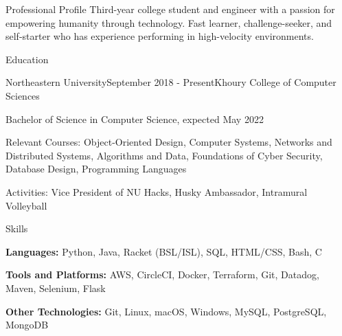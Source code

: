 \documentclass{resume}
\begin{document}
\begin{rSection}{Professional Profile}
Third-year college student and engineer with a passion for empowering humanity through technology. 
Fast learner, challenge-seeker, and self-starter who has experience performing in high-velocity environments.      
\end{rSection}


\begin{rSection}{Education}
\begin{rSubsection}{Northeastern University}{September 2018 - Present}{Khoury College of Computer Sciences}{}
\item Bachelor of Science in Computer Science, expected May 2022
\item Relevant Courses: Object-Oriented Design, Computer Systems, Networks and Distributed Systems,  Algorithms and Data, Foundations of Cyber Security, Database Design, Programming Languages
\item Activities: Vice President of NU Hacks, Husky Ambassador, Intramural Volleyball
\end{rSubsection}

\end{rSection}

\begin{rSection}{Skills}
  \begin{list}{\tiny\raisebox{1ex}{\textbullet}}{\leftmargin=2.0em}
    \item {\bf Languages:} Python, Java, Racket (BSL/ISL), SQL, HTML/CSS, Bash, C
    \item {\bf Tools and Platforms:} AWS, CircleCI, Docker, Terraform, Git, Datadog, Maven, Selenium,
    Flask
    \item {\bf Other Technologies:} Git, Linux, macOS, Windows, MySQL, PostgreSQL, MongoDB
  \end{list}
\end{rSection}
\end{document}

